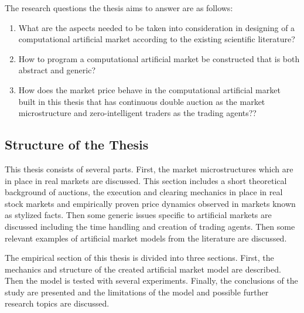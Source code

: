 The research questions the thesis aims to answer are as follows:
\begin{enumerate}
    \item What are the aspects needed to be taken into consideration in designing of a computational 
          artificial market according to the existing scientific literature?
	\item How to program a computational artificial market be constructed that is both abstract and generic?
    \item How does the market price behave in the computational artificial market built in this thesis that has continuous
          double auction as the market microstructure and zero-intelligent traders as the 
          trading agents??
\end{enumerate}


\subsection{Structure of the Thesis}
This thesis consists of several parts. First, the market microstructures which are in place in real 
markets are discussed. This section includes a short theoretical background of auctions, the execution and clearing mechanics in place in real
stock markets and empirically proven price dynamics observed in markets known as stylized
facts. Then some generic issues specific to artificial markets are discussed including the time handling and creation
of trading agents. Then some relevant examples of artificial market models from the literature are discussed. 

The empirical section of this thesis is divided into three sections. First, the mechanics and
structure of the created artificial market model are described. Then the model is tested
with several experiments. Finally, the conclusions of the study are presented and the limitations of the model and
possible further research topics are discussed.